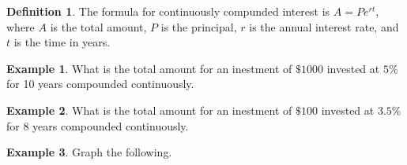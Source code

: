 \documentclass{report}
\theoremstyle{definition}
\newtheorem{example}{\bf Example}
\newtheorem{definition}{\bf Definition}[section]
\begin{document}
\begin{definition}
The formula for continuously compunded interest is $A=Pe^{rt}$, where $A$ is the total amount, $P$ is the principal, $r$ is the annual interest rate, and $t$ is the time in years.
\end{definition}


 \newpage
 
 
 \begin{example}
 What is the total amount for an inestment of $\$1000$ invested at $5\%$ for 10 years compounded continuously.
 \end{example}
 
 \vfill
 
  \begin{example}
 What is the total amount for an inestment of $\$100$ invested at $3.5\%$ for 8 years compounded continuously.
 \end{example}
 
 \vfill
 
 \begin{example}
 Graph the following.
 \end{example}
 
\end{document}
